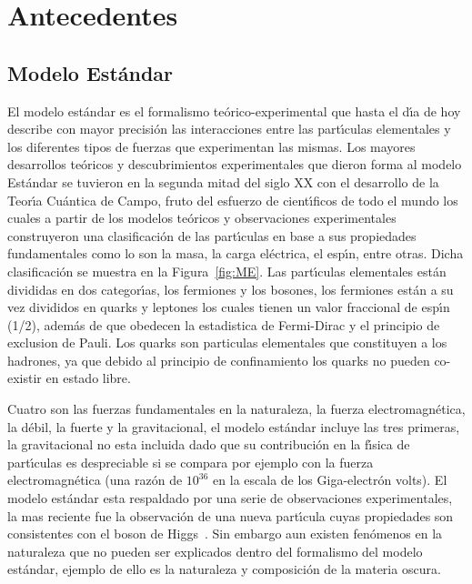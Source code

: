 \chapter{Antecedentes}

\section{Modelo Est\'andar}

El modelo est\'andar es el formalismo te\'orico-experimental que hasta el d\'{\i}a de hoy  describe con mayor precisi\'on las interacciones entre las part\'{\i}culas elementales y los diferentes tipos de fuerzas que experimentan las mismas. Los mayores desarrollos te\'oricos y descubrimientos experimentales que dieron forma al modelo Est\'andar se tuvieron en la segunda mitad del siglo XX con el desarrollo de la Teor\'{\i}a Cu\'antica de Campo, fruto del esfuerzo de cient\'{\i}ficos de todo el mundo los cuales a partir de los modelos te\'oricos y observaciones experimentales construyeron una clasificaci\'on de las part\'{\i}culas en base a sus propiedades fundamentales como lo son la masa, la carga el\'ectrica, el esp\'{\i}n, entre otras. Dicha clasificaci\'on se muestra en la Figura~\ref{fig:ME}. Las part\'{\i}culas elementales est\'an divididas en dos categor\'{\i}as, los fermiones y los bosones, los fermiones est\'an a su vez divididos en quarks y leptones los cuales tienen un valor fraccional de esp\'{\i}n (1/2), adem\'as de que obedecen la estadistica de Fermi-Dirac y el principio de exclusion de Pauli. Los quarks son particulas elementales que constituyen a los hadrones, ya que debido al principio de confinamiento los quarks no pueden co-existir en estado libre.

Cuatro son las fuerzas fundamentales en la naturaleza, la fuerza electromagn\'etica, la d\'ebil, la fuerte y la gravitacional, el modelo est\'andar incluye las tres primeras, la gravitacional no esta incluida dado que su contribuci\'on en la f\'{\i}sica de part\'{\i}culas es despreciable si se compara por ejemplo con la fuerza electromagn\'etica (una raz\'on de $10^{36}$ en la escala de los Giga-electr\'on volts). El modelo est\'andar esta respaldado por una serie de observaciones experimentales, la mas reciente fue la observaci\'on de una nueva part\'{\i}cula cuyas propiedades son consistentes con el boson de Higgs~\cite{higgs}. Sin embargo aun existen fen\'omenos en la naturaleza que no pueden ser explicados dentro del formalismo del modelo est\'andar, ejemplo de ello es la naturaleza y composici\'on de la materia oscura.

